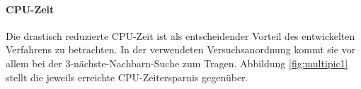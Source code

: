 \paragraph*{CPU-Zeit}
Die drastisch reduzierte CPU-Zeit ist als entscheidender Vorteil des entwickelten Verfahrens zu betrachten. In der verwendeten Versuchsanordnung kommt sie vor allem bei der 3-nächste-Nachbarn-Suche zum Tragen. Abbildung \ref{fig:multipic1} stellt die jeweils erreichte CPU-Zeitersparnis gegenüber.
\begin{figure}[hpbt]
 \centering
  \hspace{0.01\textwidth}
  \\[0pt] %
  \hspace{0.01\textwidth}

\end{figure}
